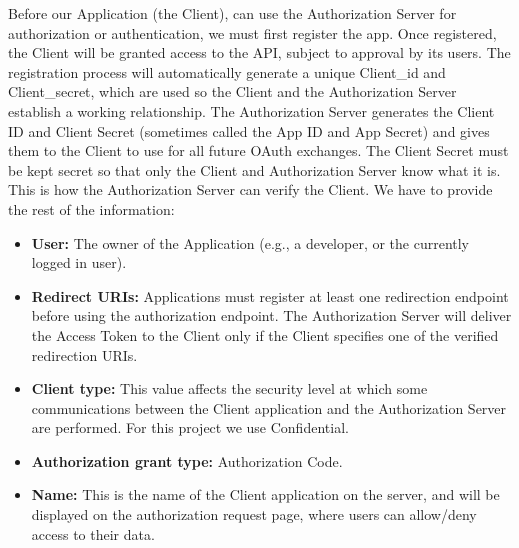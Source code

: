Before our Application (the Client), can use the Authorization Server for authorization or authentication, we must first register the app. Once registered, the Client will be granted access to the API, subject to approval by its users. The registration process will automatically generate a unique Client\_id and Client\_secret, which are used so the Client and the Authorization Server establish a working relationship. The Authorization Server generates the Client ID and Client Secret (sometimes called the App ID and App Secret) and gives them to the Client to use for all future OAuth exchanges. The Client Secret must be kept secret so that only the Client and Authorization Server know what it is. This is how the Authorization Server can verify the Client. We have to provide the rest of the information:

\begin{itemize}

	\item \textbf{User:} The owner of the Application (e.g., a developer, or the currently logged in user).

	\item \textbf{Redirect URIs:} Applications must register at least one redirection endpoint before using the authorization endpoint. The Authorization Server will deliver the Access Token to the Client only if the Client specifies one of the verified redirection URIs.

	\item \textbf{Client type:} This value affects the security level at which some communications between the Client application and the Authorization Server are performed. For this project we use Confidential.

	\item \textbf{Authorization grant type:} Authorization Code.

	\item \textbf{Name:} This is the name of the Client application on the server, and will be displayed on the authorization request page, where users can allow/deny access to their data.

\end{itemize}

